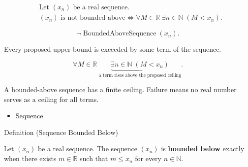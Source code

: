 \begin{remark*}
\[
\begin{aligned}
&\text{Let } (x_n) \text{ be a real sequence.}\\
&(x_n) \text{ is not bounded above}
\Longleftrightarrow
\forall M \in \mathbb{R}\;
\exists n \in \mathbb{N}\;(M < x_n).
\end{aligned}
\]
\end{remark*}

\begin{remark*}
\[
\neg\operatorname{BoundedAboveSequence}(x_n).
\]
\end{remark*}

\begin{remark*}
Every proposed upper bound is exceeded by some term of the sequence.
\end{remark*}

\begin{remark*}
\[
\forall M \in \mathbb{R}\;
\underbrace{\exists n \in \mathbb{N}\;(M < x_n)}
_{\text{a term rises above the proposed ceiling}}.
\]
\end{remark*}

\begin{remark*}[Interpretation]
A bounded-above sequence has a finite ceiling. Failure means no real number
serves as a ceiling for all terms.
\end{remark*}

\begin{dependencies}
\begin{itemize}
  \item \hyperref[def:sequence]{Sequence}
\end{itemize}
\end{dependencies}


\begin{definitionbox}{Definition (Sequence Bounded Below)}
\begin{definition}
\label{def:sequence-bounded-below}
Let $(x_n)$ be a real sequence. The sequence $(x_n)$ is
\textbf{bounded below} exactly when there exists $m \in \mathbb{R}$ such
that $m \le x_n$ for every $n \in \mathbb{N}$.
\end{definition}
\end{definitionbox}


